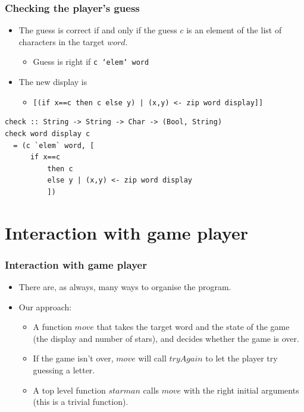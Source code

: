 \documentclass{beamer}
\begin{document}
\begin{frame}[fragile]
\frametitle{Checking the player's guess}

\begin{itemize}
\item The guess is correct if and only if the guess $c$ is an
  element of the list of characters in the target $word$.
  \begin{itemize}
  \item Guess is right if \texttt{c `elem` word}
  \end{itemize}
\item The new display is
  \begin{itemize}
  \item \texttt{[(if x==c then c else y) | (x,y) <- zip word display]]}
  \end{itemize}
\end{itemize}

\begin{verbatim}
check :: String -> String -> Char -> (Bool, String)
check word display c
  = (c `elem` word, [
      if x==c 
          then c 
          else y | (x,y) <- zip word display
          ])
\end{verbatim}

\end{frame}

\section{Interaction with game player}
\begin{frame}[fragile]
\frametitle{Interaction with game player}

\begin{itemize}
\item There are, as always, many ways to organise the program.
\item Our approach:
  \begin{itemize}
  \item A function $move$ that takes the target word and the state
    of the game (the display and number of stars), and decides
    whether the game is over.
  \item If the game isn't over, $move$ will call $tryAgain$ to let the
    player try guessing a letter.
  \item A top level function $starman$ calls $move$ with the right
    initial arguments (this is a trivial function).
  \end{itemize}
\end{itemize}
\end{frame}
\end{document}
